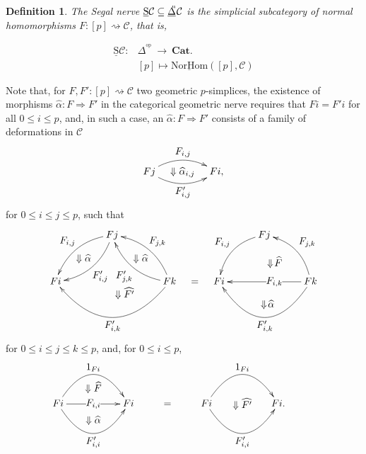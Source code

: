 \documentclass[]{amsart}
\newtheorem{definition}[theorem]{Definition}
\begin{document}
\begin{definition}
The {\em Segal nerve} $\underline{\mathrm{S}}{\ensuremath{\mathcal{C}}}\subseteq {\ensuremath{\underline{\Delta}}}\hspace{-4pt}^{^\mathrm{u}}{\ensuremath{\mathcal{C}}}$ is
the simplicial subcategory of normal homomorphisms $F:[p]\rightsquigarrow{\ensuremath{\mathcal{C}}}$, that is,

$$ \begin{array}{ll} \underline{\mathrm{S}}{\ensuremath{\mathcal{C}}}:&\Delta^{\!^{\mathrm{op}}}\ \to \ {\ensuremath{\mathbf{Cat}}}.\\[6pt]
&[p]\mapsto {\ensuremath{\underline{\mathrm{NorHom}}}}([p],{\ensuremath{\mathcal{C}}})\end{array}$$
\end{definition}

Note that, for $F,F':[p]\rightsquigarrow{\ensuremath{\mathcal{C}}}$ two geometric $p$-simplices, the existence of morphisms
$\widehat{\alpha}:F \Rightarrow F'$ in the categorical geometric nerve requires that $Fi=F'i$ for
all $0\leq i\leq p$, and, in such a case, an $\widehat{\alpha}:F\Rightarrow F'$ consists of a
family of deformations   in ${\ensuremath{\mathcal{C}}}$ \begin{equation}\label{1.2.21'} \xymatrix@C=9pt@R=9pt{ Fj
\ar@/^1pc/[rr]^{\textstyle F_{i,j}} \ar@/_1pc/[rr]_{\textstyle F'_{i,j}} & \scriptstyle{\textstyle
\Downarrow \widehat{\alpha}_{i,j}} & Fi,}
\end{equation}
for $0\leq i \leq j\leq p$, such that
\begin{equation}\label{1.2.18}
\xymatrix@C=9pt@R=9pt{ && Fj \ar@/_1pc/[lldd]_{\textstyle F_{i,j}} \ar@/^1pc/[lldd]^{\textstyle
F'_{i,j}} &&& &&& Fj
\ar@/_1pc/[lldd]_{\textstyle F_{i,j}} && \\
&\Downarrow \widehat{\alpha}&& \Downarrow\widehat{\alpha}&&&&& \ar@{}[d]^>>>>>>>{\textstyle\Downarrow\! \widehat{F}}&&\\
Fi &&\ar@{}[d]^{\textstyle \Downarrow\widehat{F'}}&& Fk \ar@/_1pc/[lluu]_{\textstyle F_{j,k}}
\ar@/^1pc/[lluu]^{\textstyle F'_{j,k}} \ar@/^3pc/[llll]^{\textstyle F'_{i,k}} & = & Fi &&&& Fk
\ar[llll]|<<<<<<<<<<{\textstyle F_{i,k}} \ar@/^3pc/[llll]^{\textstyle F'_{i,k}}\ar@/_1pc/[lluu]_{\textstyle F_{j,k}} \\
&&  &&&&&&\ \  \Downarrow\!\widehat{\alpha}}
\end{equation}
for  $0\leq i\leq j\leq k\leq p$, and, for $0\leq i\leq p$,
$$
\xymatrix{ &&&&&&\\Fi \ar@/^2.5pc/[rr]^{\textstyle 1_{Fi}} \ar[rr]|{\textstyle
F_{i,i}}\ar@/_2.5pc/[rr]_{\textstyle F'_{i,i}}\ar@{}[rru]|{\textstyle \Downarrow \widehat{F}}
\ar@{}[rrd]|{\textstyle \Downarrow \widehat{\alpha}} &  & Fi&=&Fi \ar@/^2.5pc/[rr]^{\textstyle
1_{Fi}} \ar@/_2.5pc/[rr]_{\textstyle F'_{i,i}}\ar@{}[rr]|{\textstyle \Downarrow \widehat{F'}}
 &  & Fi.\\
&&&&&&&}
$$
\end{document}

